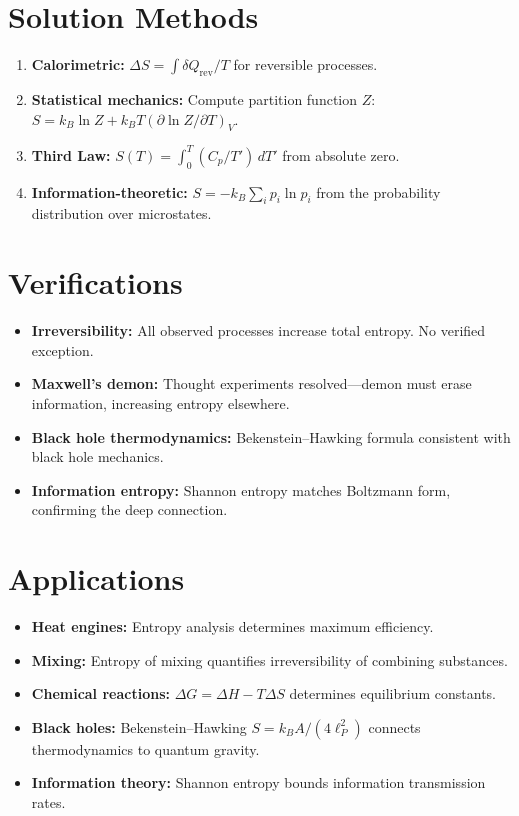 \documentclass[11pt,openright]{book}
\begin{document}
\section*{Solution Methods}

\begin{enumerate}
\item \textbf{Calorimetric:} $\Delta S = \int \delta Q_{\text{rev}} / T$ for reversible processes.
\item \textbf{Statistical mechanics:} Compute partition function $Z$: $S = k_B \ln Z + k_B T (\partial \ln Z / \partial T)_V$.
\item \textbf{Third Law:} $S(T) = \int_0^T (C_p / T') \, dT'$ from absolute zero.
\item \textbf{Information-theoretic:} $S = -k_B \sum_i p_i \ln p_i$ from the probability distribution over microstates.
\end{enumerate}
\section*{Verifications}

\begin{itemize}
\item \textbf{Irreversibility:} All observed processes increase total entropy. No verified exception.
\item \textbf{Maxwell's demon:} Thought experiments resolved---demon must erase information, increasing entropy elsewhere.
\item \textbf{Black hole thermodynamics:} Bekenstein--Hawking formula consistent with black hole mechanics.
\item \textbf{Information entropy:} Shannon entropy matches Boltzmann form, confirming the deep connection.
\end{itemize}
\section*{Applications}

\begin{itemize}
\item \textbf{Heat engines:} Entropy analysis determines maximum efficiency.
\item \textbf{Mixing:} Entropy of mixing quantifies irreversibility of combining substances.
\item \textbf{Chemical reactions:} $\Delta G = \Delta H - T\Delta S$ determines equilibrium constants.
\item \textbf{Black holes:} Bekenstein--Hawking $S = k_B A / (4 \ell_P^2)$ connects thermodynamics to quantum gravity.
\item \textbf{Information theory:} Shannon entropy bounds information transmission rates.
\end{itemize}
\end{document}
